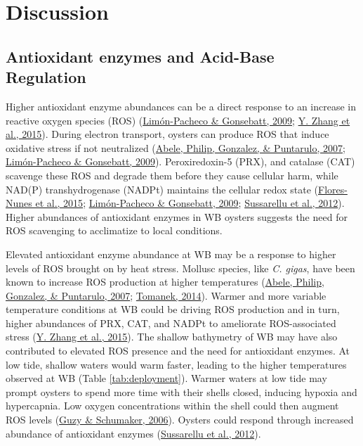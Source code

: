 \documentclass [11pt, proquest] {uwthesis}[2015/03/03]
\begin{document}
\hypertarget{discussion}{%
\section{Discussion}\label{discussion}}

\hypertarget{antioxidant-enzymes-and-acid-base-regulation}{%
\subsection{Antioxidant enzymes and Acid-Base Regulation}\label{antioxidant-enzymes-and-acid-base-regulation}}

Higher antioxidant enzyme abundances can be a direct response to an increase in reactive oxygen species (ROS) (\protect\hyperlink{ref-Limon-Pacheco2009}{Limón-Pacheco \& Gonsebatt, 2009}; \protect\hyperlink{ref-Zhang2015}{Y. Zhang et al., 2015}). During electron transport, oysters can produce ROS that induce oxidative stress if not neutralized (\protect\hyperlink{ref-Abele2007}{Abele, Philip, Gonzalez, \& Puntarulo, 2007}; \protect\hyperlink{ref-Limon-Pacheco2009}{Limón-Pacheco \& Gonsebatt, 2009}). Peroxiredoxin-5 (PRX), and catalase (CAT) scavenge these ROS and degrade them before they cause cellular harm, while NAD(P) transhydrogenase (NADPt) maintains the cellular redox state (\protect\hyperlink{ref-Flores-Nunes2015}{Flores-Nunes et al., 2015}; \protect\hyperlink{ref-Limon-Pacheco2009}{Limón-Pacheco \& Gonsebatt, 2009}; \protect\hyperlink{ref-Sussarellu2012}{Sussarellu et al., 2012}). Higher abundances of antioxidant enzymes in WB oysters suggests the need for ROS scavenging to acclimatize to local conditions.

Elevated antioxidant enzyme abundance at WB may be a response to higher levels of ROS brought on by heat stress. Mollusc species, like \emph{C. gigas}, have been known to increase ROS production at higher temperatures (\protect\hyperlink{ref-Abele2007}{Abele, Philip, Gonzalez, \& Puntarulo, 2007}; \protect\hyperlink{ref-Tomanek2014}{Tomanek, 2014}). Warmer and more variable temperature conditions at WB could be driving ROS production and in turn, higher abundances of PRX, CAT, and NADPt to ameliorate ROS-associated stress (\protect\hyperlink{ref-Zhang2015}{Y. Zhang et al., 2015}). The shallow bathymetry of WB may have also contributed to elevated ROS presence and the need for antioxidant enzymes. At low tide, shallow waters would warm faster, leading to the higher temperatures observed at WB (Table \ref{tab:deployment}). Warmer waters at low tide may prompt oysters to spend more time with their shells closed, inducing hypoxia and hypercapnia. Low oxygen concentrations within the shell could then augment ROS levels (\protect\hyperlink{ref-Guzy2006}{Guzy \& Schumaker, 2006}). Oysters could respond through increased abundance of antioxidant enzymes (\protect\hyperlink{ref-Sussarellu2012}{Sussarellu et al., 2012}).
\end{document}

